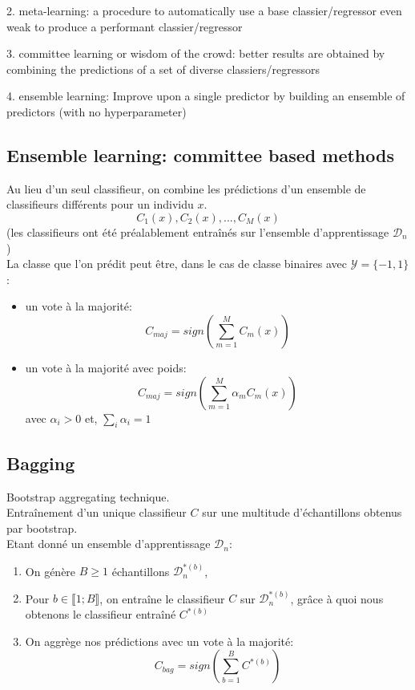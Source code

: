 \documentclass[a4paper]{article}
\theoremstyle{plain}
\begin{document}
2. meta-learning: a procedure to automatically use a base
classier/regressor even weak to produce a performant
classier/regressor


3. committee learning or wisdom of the crowd: better results
are obtained by combining the predictions of a set of diverse
classiers/regressors


4. ensemble learning: Improve upon a single predictor by
building an ensemble of predictors (with no hyperparameter)


\subsection{Ensemble learning: committee based methods}

Au lieu d'un seul classifieur, on combine les prédictions d'un ensemble de classifieurs différents pour un individu $x$. 
$$ C_1(x), C_2(x), ... , C_M(x)$$
(les classifieurs ont été préalablement entraînés sur l'ensemble d'apprentissage $\mathcal{D}_n$)\\


La classe que l'on prédit peut être, dans le cas de classe binaires avec $\mathcal{Y} = \{-1,1\}$:
\begin{itemize}
\item un vote à la majorité:
$$ C_{maj} = sign \left(  \sum_{m=1}^M C_m(x) \right) $$
\item un vote à la majorité avec poids:
$$ C_{maj} = sign \left(  \sum_{m=1}^M \alpha_m C_m(x) \right) $$
avec $\alpha_i > 0$ et, $ \sum_i \alpha_i = 1$
\end{itemize}

\subsection{Bagging}
Bootstrap aggregating technique.\\

Entraînement d'un unique classifieur $C$ sur une multitude d'échantillons obtenus par bootstrap.\\

Etant donné un ensemble d'apprentissage $\mathcal{D}_n$:

\begin{enumerate}
\item On génère $B \geq 1 $ échantillons $\mathcal{D}_n^{*(b)}$,
\item Pour $b \in \llbracket 1; B \rrbracket$, on entraîne le classifieur $C$ sur $\mathcal{D}_n^{*(b)}$, grâce à quoi nous obtenons le classifieur entraîné $C^{*(b)}$
\item On aggrège nos prédictions avec un vote à la majorité:
$$ C_{bag} = sign \left(  \sum_{b=1}^B C^{*(b)} \right) $$
\end{enumerate}
\end{document}
